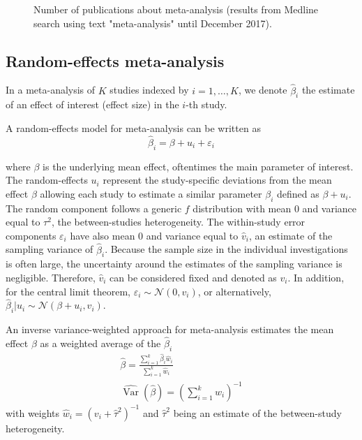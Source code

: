 \documentclass[11pt,a4paper,twoside,openany]{book}\usepackage{knitr}
\DeclareMathOperator{\Var}{Var}
\begin{document}
{\begin{knitrout}
\begin{figure}[ht!]
{}

\caption[Number of publications about meta-analysis (results from Medline search using text "meta-analysis" until December 2017)]{Number of publications about meta-analysis (results from Medline search using text "meta-analysis" until December 2017).}\label{fig:num_meta-analysis}
\end{figure}


\end{knitrout}


\subsection{Random-effects meta-analysis}

In a meta-analysis of $K$ studies indexed by $i = 1, \dots, K$, we denote $\hat \beta_i$ the estimate of an effect of interest (effect size) in the $i$-th study.

A random-effects model for meta-analysis can be written as
\begin{equation}
\hat \beta_i = \beta + u_i + \varepsilon_i
\label{eq:rma}
\end{equation}

\noindent where $\beta$ is the underlying mean effect, oftentimes the main parameter of interest. The random-effects $u_i$ represent the study-specific deviations from the mean effect $\beta$ allowing each study to estimate a similar parameter $\beta_i$ defined as $\beta + u_i $. The random component follows a generic $f$ distribution with mean 0 and variance equal to $\tau^2$, the between-studies heterogeneity. 
The within-study error components $\varepsilon_i$ have also mean 0 and variance equal to $\hat v_i$, an estimate of the sampling variance of $\hat \beta_i$.
Because the sample size in the individual investigations is often large, the uncertainty around the estimates of the sampling variance is negligible. Therefore, $\hat v_i$ can be considered fixed and denoted as $v_i$. In addition, for the central limit theorem, $\varepsilon_i \sim  \mathcal{N}\left(0, v_i \right)$, or alternatively, $\hat \beta_i | u_i \sim \mathcal{N}\left(\beta+u_i, v_i \right)$.

An inverse variance-weighted approach for meta-analysis estimates the mean effect $\beta$ as a weighted average of the $\hat \beta_i$ \citep{whitehead1991general, dersimonian1986meta}
\begin{align}
\hat \beta = \frac{\sum_{i = 1}^k \hat \beta_i \hat w_i}{\sum_{i = 1}^k \hat w_i} \label{eq:avgbeta} \\
\widehat{\Var} \left(\hat \beta \right) = \left( \sum_{i = 1}^k \hat w_i \right)^{-1}
\end{align}
\noindent with weights $\hat w_i = \left(v_i + \hat \tau^2 \right)^{-1}$ and $\hat \tau^2$ being an estimate of the between-study heterogeneity. 


}
\end{document}
